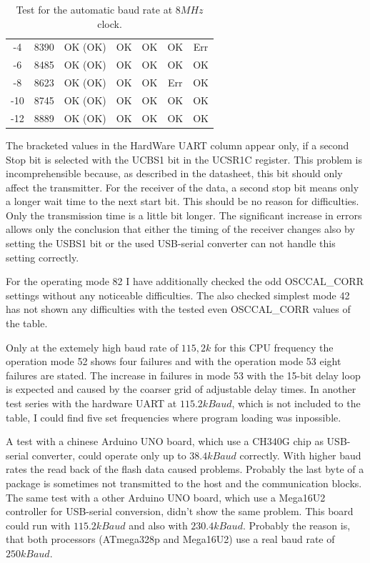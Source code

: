 \begin{table}[H]
\begin{center}
\begin{tabular}{| c | c || c | c | c || c | c |}
    \hline
    -4     &  8390   &  OK (OK)   &   OK     &   OK    &  OK     &   Err \\
    -6     &  8485   &  OK (OK)   &   OK     &   OK    &  OK     &   OK  \\
    \hline
    -8     &  8623   &  OK (OK)   &   OK     &   OK    &  Err    &   OK  \\
    -10    &  8745   &  OK (OK)   &   OK     &   OK    &  OK     &   OK  \\
    -12    &  8889   &  OK (OK)   &   OK     &   OK    &  OK     &   OK  \\
    \hline
    \end{tabular}
  \end{center}
  \caption{Test for the automatic baud rate at \(8MHz\) clock.}
  \label{tab:AutoBaudTest8}
\end{table}

The bracketed values in the HardWare UART column appear only, if a second Stop bit
is selected with the UCBS1 bit in the UCSR1C register.
This problem is incomprehensible because, as described in the datasheet, this bit
should only affect the transmitter.
For the receiver of the data, a second stop bit means only a longer wait time to the next start bit.
This should be no reason for difficulties. Only the transmission time is a little bit longer.
The significant increase in errors allows only the conclusion that either the timing
of the receiver changes also by setting the USBS1 bit or the used USB-serial converter
can not handle this setting correctly.

For the operating mode 82 I have additionally checked the odd OSCCAL\_CORR settings without
any noticeable difficulties. The also checked simplest mode 42 has not shown
any difficulties with the tested even OSCCAL\_CORR values of the table.

Only at the extemely high baud rate of \(115,2k\) for this CPU frequency the operation
mode 52 shows four failures and with the operation mode 53 eight failures are stated.
The increase in failures in mode 53 with the 15-bit delay loop is expected and caused by
the coarser grid of adjustable delay times.
In another test series with the hardware UART at \(115.2kBaud\), which is not included
to the table, I could find five set frequencies where program loading was inpossible.

A test with a chinese Arduino UNO board, which use a CH340G chip as USB-serial converter,
could operate only up to \(38.4kBaud\) correctly.
With higher baud rates the read back of the flash data caused problems.
Probably the last byte of a package is sometimes not transmitted to the host and
the communication blocks.
The same test with a other Arduino UNO board, which use a Mega16U2 controller
for USB-serial conversion, didn't show the same problem.
This board could run with \(115.2kBaud\) and also with \(230.4kBaud\). 
Probably the reason is, that both processors (ATmega328p and Mega16U2)
use a real baud rate of \(250kBaud\).


